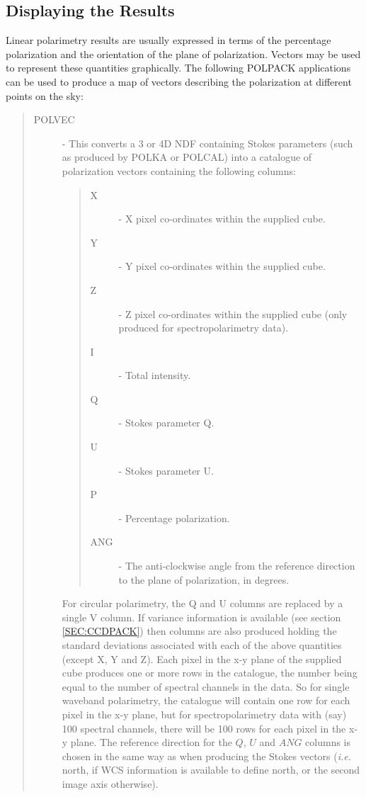 \documentclass[twoside,11pt]{article}
\newcommand{\hyperref}[4]{#2\ref{#4}#3}
\newcommand{\htmlref}[2]{#1}
\renewcommand{\_}{\texttt{\symbol{95}}}
\begin{document}
\subsection{\label{SEC:DISP}Displaying the Results}
Linear polarimetry results are usually expressed in terms of the
percentage polarization and the orientation of the plane of polarization.
Vectors may be used to represent these quantities graphically. The
following POLPACK applications can be used to produce a map of vectors
describing the polarization at different points on the sky:

\begin{quote}
\begin{description}
\item [\htmlref{POLVEC}{POLVEC}] - This converts a 3 or 4D NDF containing 
Stokes parameters (such as produced by POLKA or POLCAL) into a catalogue
of polarization vectors containing the following columns:

\begin{quote}
\begin{description}
\item [X] - X pixel co-ordinates within the supplied cube.
\item [Y] - Y pixel co-ordinates within the supplied cube.
\item [Z] - Z pixel co-ordinates within the supplied cube (only produced
            for spectropolarimetry data).
\item [I] - Total intensity.
\item [Q] - Stokes parameter Q.
\item [U] - Stokes parameter U.
\item [P] - Percentage polarization.
\item [ANG] - The anti-clockwise angle from the reference direction to 
the plane of polarization, in degrees.
\end{description}
\end{quote}

For circular polarimetry, the Q and U columns are replaced by a single V
column. If variance information is available (see \hyperref{here}{section
} {}{SEC:CCDPACK}) then columns are also produced holding the standard
deviations associated with each of the above quantities (except X, Y and
Z). Each pixel in the x-y plane of the supplied cube produces one or more
rows in the catalogue, the number being equal to the number of spectral
channels in the data. So for single waveband polarimetry, the catalogue
will contain one row for each pixel in the x-y plane, but for
spectropolarimetry data with (say) 100 spectral channels, there will be
100 rows for each pixel in the x-y plane. The reference direction for the
$Q$, $U$ and $ANG$ columns is chosen in the same way as when producing
the Stokes vectors (\emph{i.e.} north, if WCS information is available to
define north, or the second image axis otherwise).


\end{description}
\end{quote}
\end{document}
